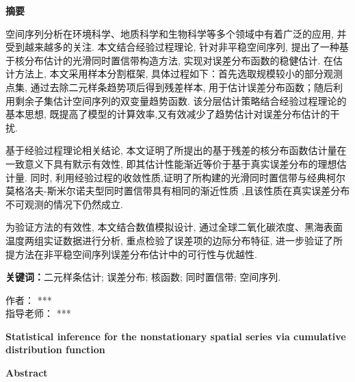 \newpage %
\thispagestyle{fancy} %
\begin{center}
  {\Large \bf 摘要}
  
\end{center}

空间序列分析在环境科学、地质科学和生物科学等多个领域中有着广泛的应用, 并受到越来越多的关注. 本文结合经验过程理论, 针对非平稳空间序列, 提出了一种基于核分布估计的光滑同时置信带构造方法, 实现对误差分布函数的稳健估计. 在估计方法上, 本文采用样本分割框架, 具体过程如下：首先选取规模较小的部分观测点集, 通过去除二元样条趋势项后得到残差样本, 用于估计误差分布函数；随后利用剩余子集估计空间序列的双变量趋势函数. 该分层估计策略结合经验过程理论的基本思想, 既提高了模型的计算效率,又有效减少了趋势估计对误差分布估计的干扰.

基于经验过程理论相关结论, 本文证明了所提出的基于残差的核分布函数估计量在一致意义下具有默示有效性, 即其估计性能渐近等价于基于真实误差分布的理想估计量. 同时, 利用经验过程的收敛性质,证明了所构建的光滑同时置信带与经典柯尔莫格洛夫-斯米尔诺夫型同时置信带具有相同的渐近性质 ,且该性质在真实误差分布不可观测的情况下仍然成立.

为验证方法的有效性, 本文结合数值模拟设计, 通过全球二氧化碳浓度、黑海表面温度两组实证数据进行分析, 重点检验了误差项的边际分布特征, 进一步验证了所提方法在非平稳空间序列误差分布估计中的可行性与优越性.

{\bf 关键词：}二元样条估计; 误差分布; 核函数; 同时置信带; 空间序列.
\begin{flushright}
  作者： ***\\
指导老师： ***
\end{flushright}

\newpage %
\thispagestyle{fancy}
\begin{center}
  {\Large \bf  Statistical inference for the nonstationary spatial series via cumulative distribution function }
\end{center}


\begin{center}

  { \bf  Abstract }
\end{center}

